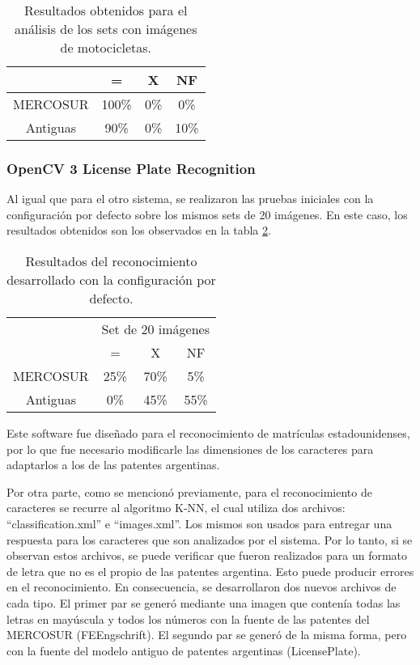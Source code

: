\begin{table}[htbp]
	\begin{center}
		\begin{tabular}{|c|c|c|c|}
			\hline
			 & = & X & NF\\
			\hline 
			MERCOSUR & 100\% & 0\% & 0\%\\ 
			\hline 
			Antiguas & 90\% & 0\% & 10\%\\ \hline
		\end{tabular}
		\caption{Resultados obtenidos para el análisis de los sets con imágenes de motocicletas.}
		\label{tabla:pat_motos}
	\end{center}
\end{table}
	
	
\subsubsection{OpenCV 3 License Plate Recognition}	
	
Al igual que para el otro sistema, se realizaron las pruebas iniciales con la configuración por defecto sobre los mismos sets de 20 imágenes. En este caso, los resultados obtenidos son los observados en la tabla \ref{tabla:opencv_Torig}.	
	
\begin{table}[htb]
	\begin{center}
		\begin{tabular}{|c|c|c|c|}
			\hline
			& \multicolumn{3}{c|}{Set de 20 imágenes}\\	
			\cline{2-4}
			& = & X & NF \\
			\hline 
			MERCOSUR & 25\% & 70\% & 5\% \\ 
			\cline{1-4}
			Antiguas & 0\% & 45\% & 55\% \\ 
			\cline{1-4}
		\end{tabular}
	\caption{Resultados del reconocimiento desarrollado con la configuración por defecto.}
	\label{tabla:opencv_Torig}
	\end{center}
\end{table}		
	
Este software fue diseñado para el reconocimiento de matrículas estadounidenses, por lo que fue necesario modificarle las dimensiones de los caracteres para adaptarlos a los de las patentes argentinas. 

Por otra parte, como se mencionó previamente, para el reconocimiento de caracteres se recurre al algoritmo K-NN, el cual utiliza dos archivos: ``classification.xml'' e ``images.xml''. Los mismos son usados para entregar una respuesta para los caracteres que son analizados por el sistema. Por lo tanto, si se observan estos archivos, se puede verificar que fueron realizados para un formato de letra que no es el propio de las patentes argentina. Esto puede producir errores en el reconocimiento. En consecuencia, se desarrollaron dos nuevos archivos de cada tipo. El primer par se generó mediante una imagen que contenía todas las letras en mayúscula y todos los números con la fuente de las patentes del MERCOSUR (FEEngschrift). El segundo par se generó de la misma forma, pero con la fuente del modelo antiguo de patentes argentinas (LicensePlate).
	
